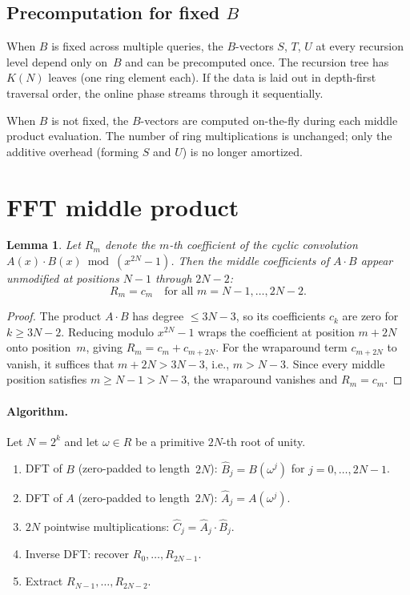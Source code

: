 \documentclass[11pt]{article}
\theoremstyle{plain}
\newtheorem{lemma}[theorem]{Lemma}
\theoremstyle{remark}
\begin{document}
\subsection{Precomputation for fixed $B$}

When $B$ is fixed across multiple queries,
the $B$-vectors $S$, $T$, $U$ at every recursion level
depend only on~$B$ and can be precomputed once.
The recursion tree has $K(N)$ leaves
(one ring element each).
If the data is laid out in depth-first traversal order,
the online phase streams through it sequentially.

When $B$ is not fixed, the $B$-vectors are computed
on-the-fly during each middle product evaluation.
The number of ring multiplications is unchanged;
only the additive overhead (forming $S$ and $U$)
is no longer amortized.

\section{FFT middle product}

\begin{lemma}\label{lem:cyclic}
Let $R_m$ denote the $m$-th coefficient of
the cyclic convolution
$A(x) \cdot B(x) \bmod (x^{2N} - 1)$.
Then the middle coefficients of $A \cdot B$
appear unmodified at positions $N{-}1$ through $2N{-}2$:
\[
R_m = c_m \quad \text{for all } m = N{-}1, \ldots, 2N{-}2.
\]
\end{lemma}

\begin{proof}
The product $A \cdot B$ has degree $\le 3N{-}3$,
so its coefficients $c_k$ are zero for $k \ge 3N{-}2$.
Reducing modulo $x^{2N} - 1$ wraps the coefficient at position $m + 2N$
onto position~$m$, giving
$R_m = c_m + c_{m+2N}$.
For the wraparound term $c_{m+2N}$ to vanish,
it suffices that $m + 2N > 3N{-}3$, i.e., $m > N{-}3$.
Since every middle position satisfies $m \ge N{-}1 > N{-}3$,
the wraparound vanishes and $R_m = c_m$.
\end{proof}

\paragraph{Algorithm.}
Let $N = 2^k$ and let $\omega \in R$
be a primitive $2N$-th root of unity.
\begin{enumerate}
\item DFT of $B$ (zero-padded to length~$2N$):
$\hat{B}_j = B(\omega^j)$ for $j = 0, \ldots, 2N{-}1$.
\item DFT of $A$ (zero-padded to length~$2N$):
$\hat{A}_j = A(\omega^j)$.
\item $2N$ pointwise multiplications:
$\hat{C}_j = \hat{A}_j \cdot \hat{B}_j$.
\item Inverse DFT: recover $R_0, \ldots, R_{2N-1}$.
\item Extract $R_{N-1}, \ldots, R_{2N-2}$.
\end{enumerate}
\end{document}
